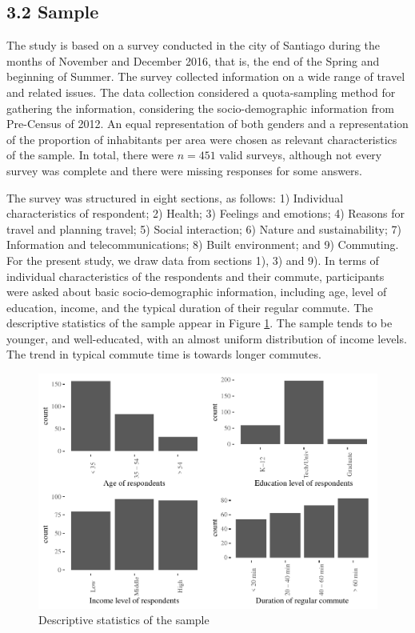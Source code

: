 \documentclass[]{elsarticle} %
\makeatletter
\def\maxwidth{\ifdim\Gin@nat@width>\linewidth\linewidth
\else\Gin@nat@width\fi}
\let\Oldincludegraphics\includegraphics
\renewcommand{\includegraphics}[1]{\Oldincludegraphics[width=\maxwidth]{#1}}
\makeatother
\begin{document}
\hypertarget{sample}{%
\subsection{3.2 Sample}\label{sample}}

The study is based on a survey conducted in the city of Santiago during
the months of November and December 2016, that is, the end of the Spring
and beginning of Summer. The survey collected information on a wide
range of travel and related issues. The data collection considered a
quota-sampling method for gathering the information, considering the
socio-demographic information from Pre-Census of 2012. An equal
representation of both genders and a representation of the proportion of
inhabitants per area were chosen as relevant characteristics of the
sample. In total, there were \(n=451\) valid surveys, although not every
survey was complete and there were missing responses for some answers.

The survey was structured in eight sections, as follows: 1) Individual
characteristics of respondent; 2) Health; 3) Feelings and emotions; 4)
Reasons for travel and planning travel; 5) Social interaction; 6) Nature
and sustainability; 7) Information and telecommunications; 8) Built
environment; and 9) Commuting. For the present study, we draw data from
sections 1), 3) and 9). In terms of individual characteristics of the
respondents and their commute, participants were asked about basic
socio-demographic information, including age, level of education,
income, and the typical duration of their regular commute. The
descriptive statistics of the sample appear in Figure
\ref{fig:descriptive-statistics}. The sample tends to be younger, and
well-educated, with an almost uniform distribution of income levels. The
trend in typical commute time is towards longer commutes.

\begin{figure}
\centering
\includegraphics{Dissonance_Santiago_v1_files/figure-latex/plot-descriptive-statistics-1.pdf}
\caption{\label{fig:descriptive-statistics}Descriptive statistics of the
sample}
\end{figure}
\end{document}

